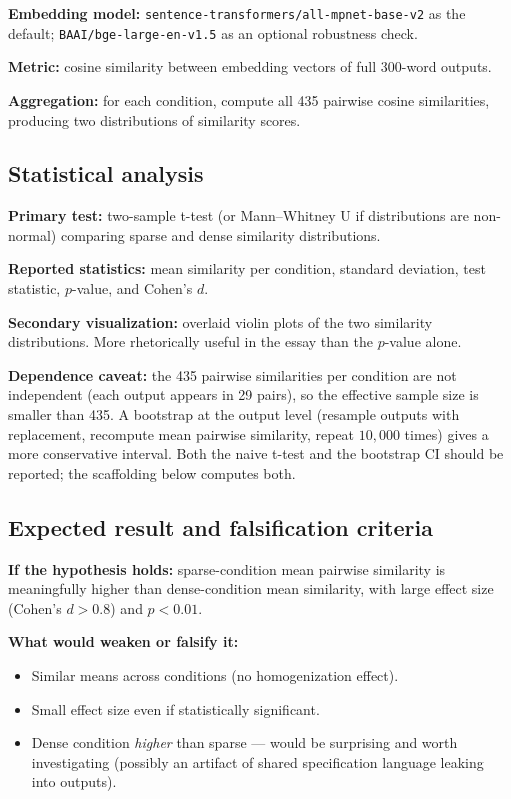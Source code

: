 \documentclass[11pt]{article}
\begin{document}
\textbf{Embedding model:} \texttt{sentence-transformers/all-mpnet-base-v2} as the default; \texttt{BAAI/bge-large-en-v1.5} as an optional robustness check.

\textbf{Metric:} cosine similarity between embedding vectors of full 300-word outputs.

\textbf{Aggregation:} for each condition, compute all 435 pairwise cosine similarities, producing two distributions of similarity scores.

\subsection{Statistical analysis}

\textbf{Primary test:} two-sample t-test (or Mann--Whitney U if distributions are non-normal) comparing sparse and dense similarity distributions.

\textbf{Reported statistics:} mean similarity per condition, standard deviation, test statistic, $p$-value, and Cohen's $d$.

\textbf{Secondary visualization:} overlaid violin plots of the two similarity distributions. More rhetorically useful in the essay than the $p$-value alone.

\textbf{Dependence caveat:} the 435 pairwise similarities per condition are not independent (each output appears in 29 pairs), so the effective sample size is smaller than 435. A bootstrap at the output level (resample outputs with replacement, recompute mean pairwise similarity, repeat $10{,}000$ times) gives a more conservative interval. Both the naive t-test and the bootstrap CI should be reported; the scaffolding below computes both.

\subsection{Expected result and falsification criteria}

\textbf{If the hypothesis holds:} sparse-condition mean pairwise similarity is meaningfully higher than dense-condition mean similarity, with large effect size (Cohen's $d > 0.8$) and $p < 0.01$.

\textbf{What would weaken or falsify it:}
\begin{itemize}[leftmargin=*,itemsep=2pt,topsep=4pt]
  \item Similar means across conditions (no homogenization effect).
  \item Small effect size even if statistically significant.
  \item Dense condition \emph{higher} than sparse --- would be surprising and worth investigating (possibly an artifact of shared specification language leaking into outputs).
\end{itemize}
\end{document}
